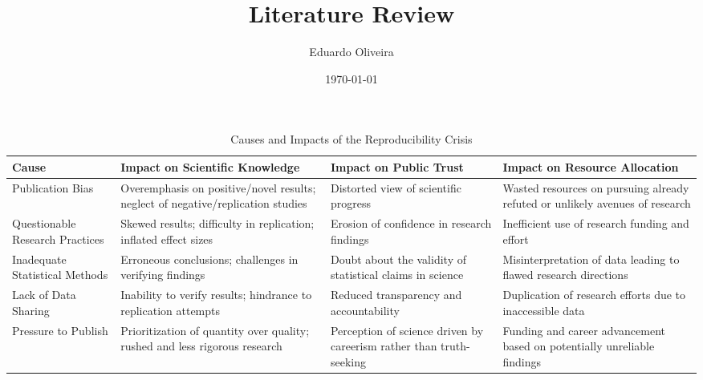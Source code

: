 \documentclass{article}
\title{Literature Review}
\author{Eduardo Oliveira}
\date{\today}
\begin{document}
\maketitle

\listoftodos



\renewcommand{\arraystretch}{1.5}

\begin{table}[ht]
    \centering
    \caption{Causes and Impacts of the Reproducibility Crisis}
    \label{table:reproducibility_crisis} %
    \begin{tabularx}{\textwidth}{|X|X|X|X|}
        \hline
        Cause                                            & Impact on Scientific Knowledge                                                  & Impact on Public Trust                                              & Impact on Resource Allocation                                                                           \\
        \hline
        Publication Bias                                 & Overemphasis on positive/novel results; neglect of negative/replication studies & Distorted view of scientific progress                               & Wasted resources on pursuing already refuted or unlikely avenues of research                            \\
        \hline
        Questionable Research Practices                  & Skewed results; difficulty in replication; inflated effect sizes                & Erosion of confidence in research findings                          & Inefficient use of research funding and effort                                                          \\
        \hline
        Inadequate Statistical Methods                   & Erroneous conclusions; challenges in verifying findings                         & Doubt about the validity of statistical claims in science           & Misinterpretation of data leading to flawed research directions                                         \\
        \hline
        Lack of Data Sharing                             & Inability to verify results; hindrance to replication attempts                  & Reduced transparency and accountability                             & Duplication of research efforts due to inaccessible data                                                \\
        \hline
        Pressure to Publish                              & Prioritization of quantity over quality; rushed and less rigorous research      & Perception of science driven by careerism rather than truth-seeking & Funding and career advancement based on potentially unreliable findings                                 \\

\end{tabularx}
\end{table}
\end{document}
